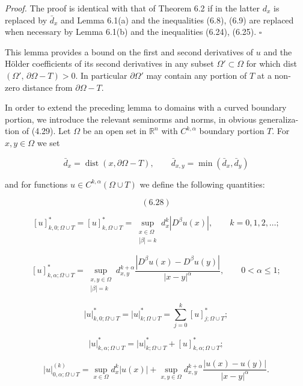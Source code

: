 \medskip

\noindent\textit{Proof.} \quad The proof is identical with that of Theorem 6.2 if in the latter $d_x$ is replaced
by $\bar d_x$ and Lemma 6.1(a) and the inequalities (6.8), (6.9) are replaced when necessary
by Lemma 6.1(b) and the inequalities (6.24), (6.25). $\square$

\medskip

\noindent This lemma provides a bound on the first and second derivatives of $u$ and
the H\"older coefficients of its second derivatives in any subset $\Omega' \subset \Omega$ for which
dist $(\Omega',\,\partial \Omega - T)>0$. In particular $\partial \Omega'$ may contain any portion of $T$ at a non-
zero distance from $\partial \Omega - T$.

\medskip

\noindent In order to extend the preceding lemma to domains with a curved boundary
portion, we introduce the relevant seminorms and norms, in obvious generaliza-
tion of (4.29). Let $\Omega$ be an open set in $\mathbb{R}^n$ with $C^{k,\alpha}$ boundary portion $T$. For
$x,y \in \Omega$ we set

\[
\bar d_x = \operatorname{dist}(x,\partial \Omega - T),\qquad \bar d_{x,y}=\min(\bar d_x,\bar d_y)
\]




and for functions $u \in C^{k,\alpha}(\Omega \cup T)$ we define the following quantities:

\begin{equation*}
(6.28)
\end{equation*}

\[
[u]^{\ast}_{k,0;\Omega\cup T}=[u]^{\ast}_{k,\Omega\cup T}
= \sup_{\substack{x \in \Omega\\|\beta|=k}} d_x^k |D^\beta u(x)|,\qquad k=0,1,2,\ldots;
\]

\[
[u]^{\ast}_{k,\alpha;\Omega\cup T}
= \sup_{\substack{x,y \in \Omega\\|\beta|=k}} d_{x,y}^{k+\alpha}\frac{|D^\beta u(x)-D^\beta u(y)|}{|x-y|^\alpha},
\qquad 0<\alpha\le 1;
\]

\[
|u|^{\ast}_{k,0;\Omega\cup T}=|u|^{\ast}_{k;\Omega\cup T}
=\sum_{j=0}^k [u]^{\ast}_{j;\Omega\cup T};
\]

\[
|u|^{\ast}_{k,\alpha;\Omega\cup T}=|u|^{\ast}_{k;\Omega\cup T}+[u]^{\ast}_{k,\alpha;\Omega\cup T};
\]

\[
|u|^{(k)}_{0,\alpha;\Omega\cup T}
= \sup_{x\in\Omega} d_x^k|u(x)|+\sup_{x,y\in\Omega} d_{x,y}^{k+\alpha}\frac{|u(x)-u(y)|}{|x-y|^\alpha}.
\]

